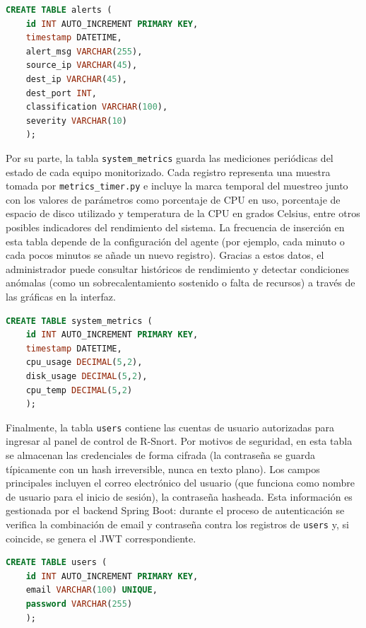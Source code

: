 \documentclass[11pt,a4paper,twoside]{report}
\begin{document}
\begin{lstlisting}[language=SQL, caption={Estructura de la tabla alerts}]
	CREATE TABLE alerts (
	id INT AUTO_INCREMENT PRIMARY KEY,
	timestamp DATETIME,
	alert_msg VARCHAR(255),
	source_ip VARCHAR(45),
	dest_ip VARCHAR(45),
	dest_port INT,
	classification VARCHAR(100),
	severity VARCHAR(10)
	);
\end{lstlisting}

Por su parte, la tabla \texttt{system\_metrics} guarda las mediciones periódicas del estado de cada equipo monitorizado. Cada registro representa una muestra tomada por \texttt{metrics\_timer.py} e incluye la marca temporal del muestreo junto con los valores de parámetros como porcentaje de CPU en uso, porcentaje de espacio de disco utilizado y temperatura de la CPU en grados Celsius, entre otros posibles indicadores del rendimiento del sistema. La frecuencia de inserción en esta tabla depende de la configuración del agente (por ejemplo, cada minuto o cada pocos minutos se añade un nuevo registro). Gracias a estos datos, el administrador puede consultar históricos de rendimiento y detectar condiciones anómalas (como un sobrecalentamiento sostenido o falta de recursos) a través de las gráficas en la interfaz.\newline

\begin{lstlisting}[language=SQL, caption={Estructura de la tabla system-metrics}]
	CREATE TABLE system_metrics (
	id INT AUTO_INCREMENT PRIMARY KEY,
	timestamp DATETIME,
	cpu_usage DECIMAL(5,2),
	disk_usage DECIMAL(5,2),
	cpu_temp DECIMAL(5,2)
	);
\end{lstlisting}

Finalmente, la tabla \texttt{users} contiene las cuentas de usuario autorizadas para ingresar al panel de control de R-Snort. Por motivos de seguridad, en esta tabla se almacenan las credenciales de forma cifrada (la contraseña se guarda típicamente con un hash irreversible, nunca en texto plano). Los campos principales incluyen el correo electrónico del usuario (que funciona como nombre de usuario para el inicio de sesión), la contraseña hasheada. Esta información es gestionada por el backend Spring Boot: durante el proceso de autenticación se verifica la combinación de email y contraseña contra los registros de \texttt{users} y, si coincide, se genera el JWT correspondiente.\newline

\begin{lstlisting}[language=SQL, caption={Estructura de la tabla users}]
	CREATE TABLE users (
	id INT AUTO_INCREMENT PRIMARY KEY,
	email VARCHAR(100) UNIQUE,
	password VARCHAR(255)
	);
\end{lstlisting}
\end{document}
